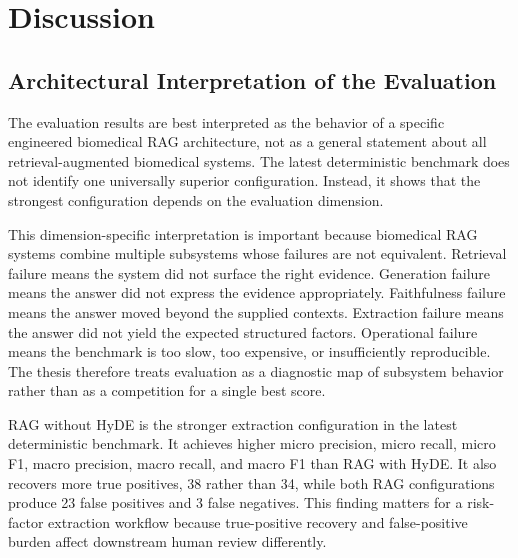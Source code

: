\chapter{Discussion}

\section{Architectural Interpretation of the Evaluation}

The evaluation results are best interpreted as the behavior of a specific engineered biomedical RAG architecture, not as a general statement about all retrieval-augmented biomedical systems. The latest deterministic benchmark does not identify one universally superior configuration. Instead, it shows that the strongest configuration depends on the evaluation dimension.

This dimension-specific interpretation is important because biomedical RAG systems combine multiple subsystems whose failures are not equivalent. Retrieval failure means the system did not surface the right evidence. Generation failure means the answer did not express the evidence appropriately. Faithfulness failure means the answer moved beyond the supplied contexts. Extraction failure means the answer did not yield the expected structured factors. Operational failure means the benchmark is too slow, too expensive, or insufficiently reproducible. The thesis therefore treats evaluation as a diagnostic map of subsystem behavior rather than as a competition for a single best score.

RAG without HyDE is the stronger extraction configuration in the latest deterministic benchmark. It achieves higher micro precision, micro recall, micro F1, macro precision, macro recall, and macro F1 than RAG with HyDE. It also recovers more true positives, 38 rather than 34, while both RAG configurations produce 23 false positives and 3 false negatives. This finding matters for a risk-factor extraction workflow because true-positive recovery and false-positive burden affect downstream human review differently.

